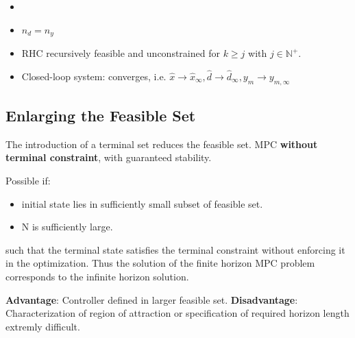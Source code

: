\documentclass[8pt,a4paper]{scrartcl}
\begin{document}
\begin{multicols*}{3}
\begin{multicols*}{4}
\begin{itemize}

\item {}
\item $n_d=n_y$
\item RHC recursively feasible and unconstrained for $k\geq j$ with $j\in\mathbb{N}^+$.
\item Closed-loop system:
converges, i.e. $\hat{x}\rightarrow\hat{x}_\infty, \hat{d}\rightarrow\hat{d}_\infty,y_m\rightarrow y_{m,\infty}$
\end{itemize}


\subsection{Enlarging the Feasible Set}

The introduction of a terminal set reduces the feasible set. \dahe MPC \textbf{without terminal constraint}, with guaranteed stability.

\finn

Possible if:
\begin{itemize}

\item initial state lies in sufficiently small subset of feasible set.
\item N is sufficiently large.
\end{itemize}

such that the terminal state satisfies the terminal constraint without enforcing it in the optimization. Thus the solution of the finite horizon MPC problem corresponds to the infinite horizon solution.

\finn

\textbf{Advantage}: Controller defined in larger feasible set.
\textbf{Disadvantage}: Characterization of region of attraction or specification of required horizon length extremly difficult.

\finn



\end{multicols*}
\end{multicols*}
\end{document}
